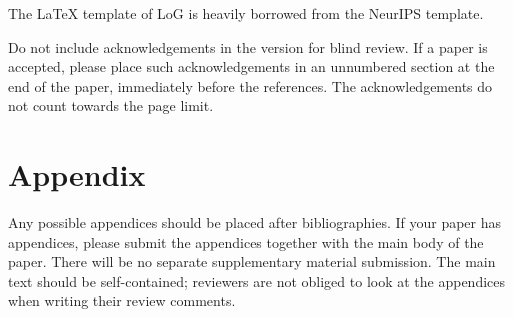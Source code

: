 \documentclass{article}
\begin{document}
The \LaTeX{} template of LoG \logyear{} is heavily borrowed from the NeurIPS template.

Do not include acknowledgements in the version for blind review.
If a paper is accepted, please place such acknowledgements in an unnumbered section at the end of the paper, immediately before the references.
The acknowledgements do not count towards the page limit.




\appendix
\section{Appendix}
Any possible appendices should be placed after bibliographies.
If your paper has appendices, please submit the appendices together with the main body of the paper.
There will be no separate supplementary material submission.
The main text should be self-contained; reviewers are not obliged to look at the appendices when writing their review comments.
\end{document}
